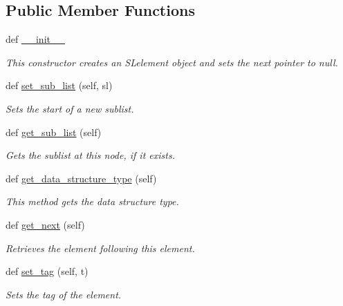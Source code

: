 \subsection*{Public Member Functions}
\begin{DoxyCompactItemize}
\item 
def \hyperlink{classbridges_1_1ml__element_1_1_m_lelement_a654fef8113197edceeb9c576bc5b477c}{\+\_\+\+\_\+init\+\_\+\+\_\+}
\begin{DoxyCompactList}\small\item\em This constructor creates an S\+Lelement object and sets the next pointer to null. \end{DoxyCompactList}\item 
def \hyperlink{classbridges_1_1ml__element_1_1_m_lelement_a578cd6c05bb6f38939bd41d0e1c93613}{set\+\_\+sub\+\_\+list} (self, sl)
\begin{DoxyCompactList}\small\item\em Sets the start of a new sublist. \end{DoxyCompactList}\item 
def \hyperlink{classbridges_1_1ml__element_1_1_m_lelement_a9a11300019a637de7b3f4a756998ac32}{get\+\_\+sub\+\_\+list} (self)
\begin{DoxyCompactList}\small\item\em Gets the sublist at this node, if it exists. \end{DoxyCompactList}\item 
def \hyperlink{classbridges_1_1ml__element_1_1_m_lelement_a97693d616263a8ee59b066829e8ce7e8}{get\+\_\+data\+\_\+structure\+\_\+type} (self)
\begin{DoxyCompactList}\small\item\em This method gets the data structure type. \end{DoxyCompactList}\item 
def \hyperlink{classbridges_1_1ml__element_1_1_m_lelement_aca0cc01e2041a3d283a3e1ceca3050da}{get\+\_\+next} (self)
\begin{DoxyCompactList}\small\item\em Retrieves the element following this element. \end{DoxyCompactList}\item 
def \hyperlink{classbridges_1_1ml__element_1_1_m_lelement_af556c1716954cfa671e1a79dff78f66a}{set\+\_\+tag} (self, t)
\begin{DoxyCompactList}\small\item\em Sets the tag of the element. \end{DoxyCompactList}\item 

\end{DoxyCompactItemize}
